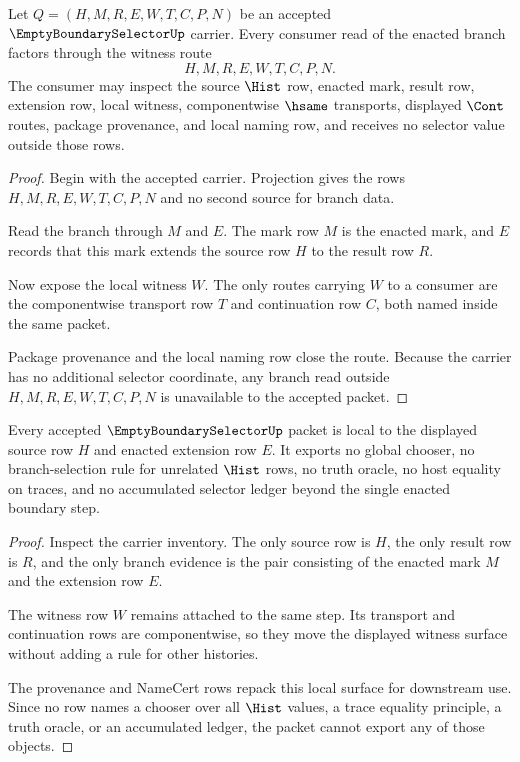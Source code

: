 \begin{theorem}
\label{thm:empty-boundary-selector-witness-exposure}
Let $Q=(H,M,R,E,W,T,C,P,N)$ be an accepted $\EmptyBoundarySelectorUp$ carrier. Every consumer read of the enacted branch factors through the witness route
$$
H,M,R,E,W,T,C,P,N.
$$
The consumer may inspect the source $\Hist$ row, enacted mark, result row, extension row, local witness, componentwise $\hsame$ transports, displayed $\Cont$ routes, package provenance, and local naming row, and receives no selector value outside those rows.
\end{theorem}
\begin{proof}
Begin with the accepted carrier. Projection gives the rows $H,M,R,E,W,T,C,P,N$ and no second source for branch data.

Read the branch through $M$ and $E$. The mark row $M$ is the enacted mark, and $E$ records that this mark extends the source row $H$ to the result row $R$.

Now expose the local witness $W$. The only routes carrying $W$ to a consumer are the componentwise transport row $T$ and continuation row $C$, both named inside the same packet.

Package provenance and the local naming row close the route. Because the carrier has no additional selector coordinate, any branch read outside $H,M,R,E,W,T,C,P,N$ is unavailable to the accepted packet.
\end{proof}

\begin{theorem}
\label{thm:empty-boundary-selector-nonescape-boundary}
Every accepted $\EmptyBoundarySelectorUp$ packet is local to the displayed source row $H$ and enacted extension row $E$. It exports no global chooser, no branch-selection rule for unrelated $\Hist$ rows, no truth oracle, no host equality on traces, and no accumulated selector ledger beyond the single enacted boundary step.
\end{theorem}
\begin{proof}
Inspect the carrier inventory. The only source row is $H$, the only result row is $R$, and the only branch evidence is the pair consisting of the enacted mark $M$ and the extension row $E$.

The witness row $W$ remains attached to the same step. Its transport and continuation rows are componentwise, so they move the displayed witness surface without adding a rule for other histories.

The provenance and NameCert rows repack this local surface for downstream use. Since no row names a chooser over all $\Hist$ values, a trace equality principle, a truth oracle, or an accumulated ledger, the packet cannot export any of those objects.
\end{proof}

